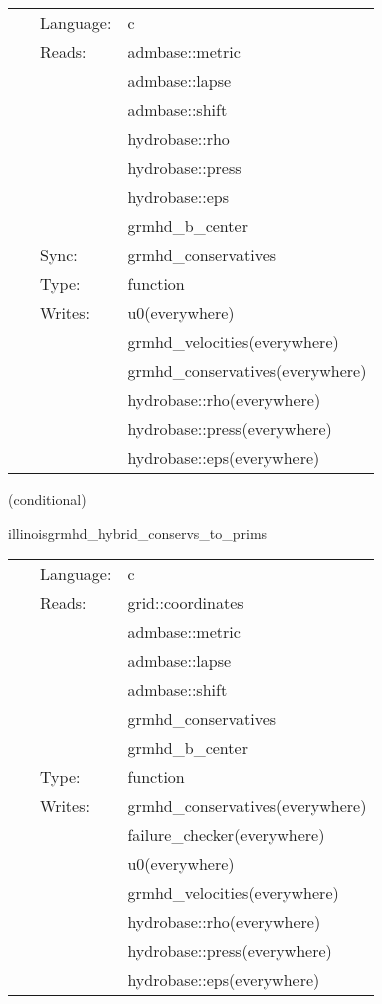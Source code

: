  \begin{tabular*}{160mm}{cll} 
~ & Language:  & c \\ 
~ & Reads:  & admbase::metric \\ 
~& ~ &admbase::lapse\\ 
~& ~ &admbase::shift\\ 
~& ~ &hydrobase::rho\\ 
~& ~ &hydrobase::press\\ 
~& ~ &hydrobase::eps\\ 
~& ~ &grmhd\_b\_center\\ 
~ & Sync:  & grmhd\_conservatives \\ 
~ & Type:  & function \\ 
~ & Writes:  & u0(everywhere) \\ 
~& ~ &grmhd\_velocities(everywhere)\\ 
~& ~ &grmhd\_conservatives(everywhere)\\ 
~& ~ &hydrobase::rho(everywhere)\\ 
~& ~ &hydrobase::press(everywhere)\\ 
~& ~ &hydrobase::eps(everywhere)\\ 
\end{tabular*} 


\vspace{5mm}

   (conditional) 

\hspace{5mm} illinoisgrmhd\_hybrid\_conservs\_to\_prims 

\hspace{5mm}{\it hybrid version of illinoisgrmhd\_conservs\_to\_prims } 


\hspace{5mm}

 \begin{tabular*}{160mm}{cll} 
~ & Language:  & c \\ 
~ & Reads:  & grid::coordinates \\ 
~& ~ &admbase::metric\\ 
~& ~ &admbase::lapse\\ 
~& ~ &admbase::shift\\ 
~& ~ &grmhd\_conservatives\\ 
~& ~ &grmhd\_b\_center\\ 
~ & Type:  & function \\ 
~ & Writes:  & grmhd\_conservatives(everywhere) \\ 
~& ~ &failure\_checker(everywhere)\\ 
~& ~ &u0(everywhere)\\ 
~& ~ &grmhd\_velocities(everywhere)\\ 
~& ~ &hydrobase::rho(everywhere)\\ 
~& ~ &hydrobase::press(everywhere)\\ 
~& ~ &hydrobase::eps(everywhere)\\ 
\end{tabular*} 


